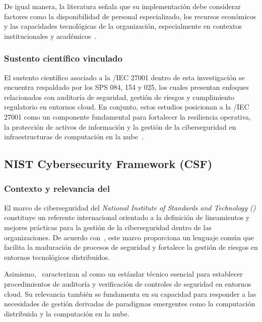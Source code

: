 De igual manera, la literatura señala que su implementación debe considerar factores como la disponibilidad de personal especializado, 
los recursos económicos y las capacidades tecnológicas de la organización, especialmente en contextos institucionales y 
académicos~\cite{gambo2025navigating}.

\subsubsection{Sustento científico vinculado}

El sustento científico asociado a la \ISO/IEC 27001 dentro de esta investigación se encuentra respaldado por los SPS 084, 154 y 025, los 
cuales presentan enfoques relacionados con auditoría de seguridad, gestión de riesgos y cumplimiento regulatorio en entornos cloud. En 
conjunto, estos estudios posicionan a la \ISO/IEC 27001 como un componente fundamental para fortalecer la resiliencia operativa, la 
protección de activos de información y la gestión de la ciberseguridad en infraestructuras de computación en la 
nube~\cite{rajesh2024unified,tissir2021cybersecurity}.


\subsection{NIST Cybersecurity Framework (CSF)}

\subsubsection{Contexto y relevancia del \NISTCSF}

El marco de ciberseguridad del \textit{National Institute of Standards and Technology (\NISTCSF)} constituye un referente internacional 
orientado a la definición de lineamientos y mejores prácticas para la gestión de la ciberseguridad dentro de las organizaciones. De 
acuerdo con~\cite{tissir2021cybersecurity}, este marco proporciona un lenguaje común que facilita la maduración de procesos de seguridad y 
fortalece la gestión de riesgos en entornos tecnológicos distribuidos.

Asimismo,~\cite{rajesh2024unified} caracterizan al \NISTCSF como un estándar técnico esencial para establecer procedimientos de auditoría y 
verificación de controles de seguridad en entornos cloud. Su relevancia también se fundamenta en su capacidad para responder a las 
necesidades de gestión derivadas de paradigmas emergentes como la computación distribuida y la computación en la nube.

